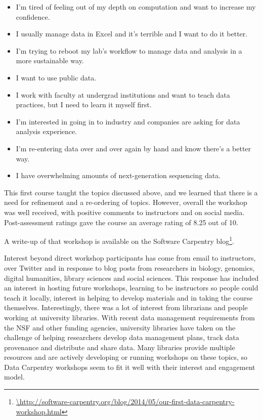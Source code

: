 \documentclass[11pt]{article}
\begin{document}
\begin{itemize}
\item I'm tired of feeling out of my depth on computation and want to increase my confidence.
\item I usually manage data in Excel and it's terrible and I want to do it better.
\item I'm trying to reboot my lab's workflow to manage data and analysis in a more sustainable way.
\item I want to use public data.
\item I work with faculty at undergrad institutions and want to teach data practices, but I need to learn it myself first.
\item I'm interested in going in to industry and companies are asking for data analysis experience.
\item I'm re-entering data over and over again by hand and know there's a better way.
\item I have overwhelming amounts of next-generation sequencing data.
\end{itemize}

This first course taught the topics discussed above, and we learned that there is a need for refinement and a 
re-ordering of topics.  However, overall the workshop was well received, with positive comments to instructors and on social media. Post-assessment ratings gave the course an average rating of 8.25 out of 10.

A write-up of that workshop is available on the Software Carpentry blog\footnote{\url{\http://software-carpentry.org/blog/2014/05/our-first-data-carpentry-workshop.html}}.

Interest beyond direct workshop participants has come from email to instructors, over Twitter and in response to blog posts from researchers in biology, genomics, digital humanities, library sciences and social sciences.
This response has 
included an interest in hosting future workshops, learning to be 
instructors so people could teach it locally, interest in helping to develop materials and in taking the course themselves.
Interestingly, there was a lot of interest from librarians and people working at university libraries. With recent data management requirements from the NSF and other funding agencies, university libraries have
taken on the challenge of helping researchers develop data management plans, track data provenance and 
distribute and share data. Many libraries provide multiple resources and are actively developing or running workshops
on these topics, so Data Carpentry workshops seem to fit it well with their interest and engagement model.
\end{document}
